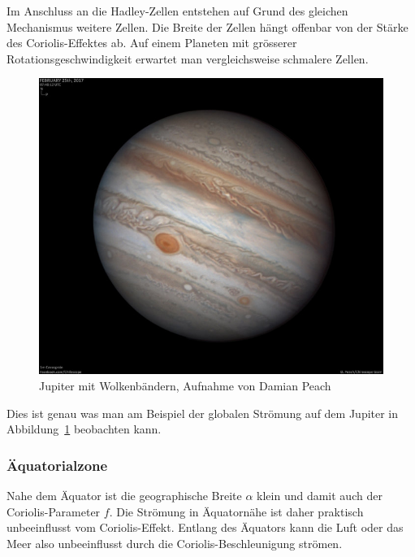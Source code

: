 Im Anschluss an die Hadley-Zellen entstehen auf Grund des gleichen
Mechanismus weitere Zellen.
Die Breite der Zellen hängt offenbar von der Stärke des Coriolis-Effektes ab.
Auf einem Planeten mit grösserer Rotationsgeschwindigkeit erwartet man
vergleichsweise schmalere Zellen.
\begin{figure}
\centering
\includegraphics[width=\hsize]{chapters/1/Jupiter_on_25_February_2017_node_full_image_2.jpg}
\caption{Jupiter mit Wolkenbändern, Aufnahme von Damian Peach
\cite{skript:jupiter}
\label{skript:jupiterzirkulation}}
\end{figure}
Dies ist genau was man am Beispiel der globalen Strömung auf dem
Jupiter in Abbildung~\ref{skript:jupiterzirkulation} beobachten kann.

\subsubsection{Äquatorialzone}
Nahe dem Äquator ist die geographische Breite $\alpha$ klein und
damit auch der Coriolis-Parameter $f$.
Die Strömung in Äquatornähe ist daher praktisch unbeeinflusst 
vom Coriolis-Effekt.
Entlang des Äquators kann die Luft oder das Meer also
unbeeinflusst durch die Coriolis-Beschleunigung strömen.

